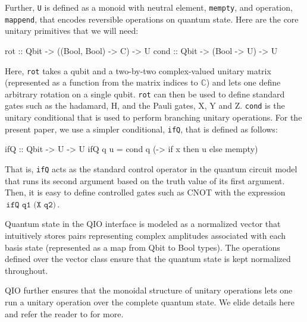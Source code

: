 \documentclass[acmsmall,nonacm,timestamp]{acmart}
\newcommand{\kw}[1]{\,\mathrm{\texttt{#1}}\,}
\begin{document}
Further, \texttt{U} is defined as a monoid with neutral element, \texttt{mempty}, and operation, \texttt{mappend}, that encodes reversible operations on quantum state. Here are the core unitary primitives that we will need:

\begin{QCode}
rot :: Qbit -> ((Bool, Bool) -> C) -> U
cond :: Qbit -> (Bool -> U) -> U
\end{QCode}

Here, \texttt{rot} takes a qubit and a two-by-two complex-valued unitary matrix (represented as a function from the matrix indices to $\mathbb{C}$) and lets one define arbitrary rotation on a single qubit. \texttt{rot} can then be used to define standard gates such as the hadamard, H, and the Pauli gates, X, Y and Z. \texttt{cond} is the unitary conditional that is used to perform branching unitary operations. For the present paper, we use a simpler conditional, \texttt{ifQ}, that is defined as follows:

\begin{QCode}
ifQ :: Qbit -> U -> U
ifQ q u = cond q (\x -> if x then u else mempty)
\end{QCode}

That is, \texttt{ifQ} acts as the standard control operator in the quantum circuit model that runs its second argument based on the truth value of its first argument. Then, it is easy to define controlled gates such as CNOT with the expression $\kw{ifQ q1 (X q2)}$.

Quantum state in the QIO interface is modeled as a normalized vector that intuitively stores pairs representing complex amplitudes associated with each basis state (represented as a map from Qbit to Bool types). The operations defined over the vector class ensure that the quantum state is kept normalized throughout.

QIO further ensures that the monoidal structure of unitary operations lets one run a unitary operation over the complete quantum state. We elide details here and refer the reader to \cite{qio} for more.

%
\end{document}
